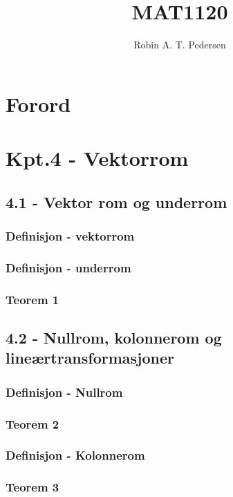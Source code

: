 \documentclass{article}
\begin{document}
  \title{MAT1120}
  \author{Robin A. T. Pedersen}
  \maketitle
  \tableofcontents

  \section{Forord}
    
  \setcounter{section}{3} %
  \section{Kpt.4 - Vektorrom}
    \subsection{4.1 - Vektor rom og underrom}
      \subsubsection{Definisjon - vektorrom}
        
      \subsubsection{Definisjon - underrom}
        
      \subsubsection{Teorem 1}
        
    \subsection{4.2 - Nullrom, kolonnerom og lineærtransformasjoner}
      \subsubsection{Definisjon - Nullrom}
        
      \subsubsection{Teorem 2}
        
      \subsubsection{Definisjon - Kolonnerom}
        
      \subsubsection{Teorem 3}
        
\end{document}
